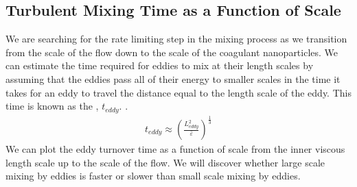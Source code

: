 \documentclass[letterpaper,10pt,english]{sphinxmanual}
\begin{document}
\subsection{Turbulent Mixing Time as a Function of Scale}
\label{\detokenize{Rapid_Mix/RM_Derivations:turbulent-mixing-time-as-a-function-of-scale}}\label{\detokenize{Rapid_Mix/RM_Derivations:heading-mixing-time-as-a-function-of-scale}}
We are searching for the rate limiting step in the mixing process as we transition from the scale of the flow down to the scale of the coagulant nanoparticles. We can estimate the time required for eddies to mix at their length scales by assuming that the eddies pass all of their energy to smaller scales in the time it takes for an eddy to travel the distance equal to the length scale of the eddy. This time is known as the ,
\(t_{eddy}\). {\hyperref[\detokenize{Rapid_Mix/RM_Derivations:heading-estimates-of-time-required-for-mixing-processes}]{}}.
\begin{equation}\label{equation:Rapid_Mix/RM_Derivations:eq_t_eddy}
\begin{split}t_{eddy} \approx \left( \frac{L_{eddy}^2}{ \bar\varepsilon }\right)^\frac{1}{3}\end{split}
\end{equation}
We can plot the eddy turnover time as a function of scale from the inner viscous length scale up to the scale of the flow. We will discover whether large scale mixing by eddies is faster or slower than small scale mixing by eddies.
\end{document}
